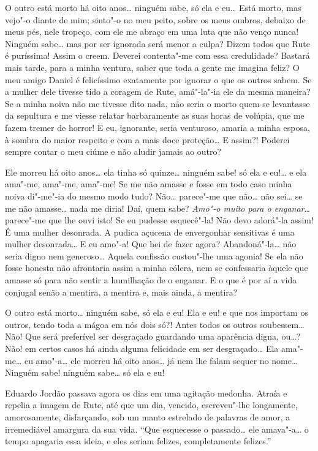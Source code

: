 O outro está morto há oito anos\ldots{} ninguém sabe, só ela e eu\ldots{} Está
morto, mas vejo"-o diante de mim; sinto"-o no meu peito, sobre os meus
ombros, debaixo de meus pés, nele tropeço, com ele me abraço em uma luta
que não venço nunca! Ninguém sabe\ldots{} mas por ser ignorada será menor a
culpa? Dizem todos que Rute é puríssima! Assim o creem. Deverei
contenta"-me com essa credulidade? Bastará mais tarde, para a minha
ventura, saber que toda a gente me imagina feliz? O meu amigo Daniel é
felicíssimo exatamente por ignorar o que os outros sabem. Se a mulher
dele tivesse tido a coragem de Rute, amá"-la"-ia ele da mesma maneira? Se
a minha noiva não me tivesse dito nada, não seria o morto quem se
levantasse da sepultura e me viesse relatar barbaramente as suas horas
de volúpia, que me fazem tremer de horror! E eu, ignorante, seria
venturoso, amaria a minha esposa, à sombra do maior respeito e com a
mais doce proteção\ldots{} E assim?! Poderei sempre contar o meu ciúme e não
aludir jamais ao outro?

Ele morreu há oito anos\ldots{} ela tinha só quinze\ldots{} ninguém sabe! só ela e
eu!\ldots{} e ela ama"-me, ama"-me, ama"-me! Se me não amasse e fosse em todo
caso minha noiva di"-me"-ia do mesmo modo tudo? Não\ldots{} parece"-me que
não\ldots{} não sei\ldots{} se me não amasse\ldots{} nada me diria! Daí, quem sabe?
\emph{Amo"-o muito para o enganar}\ldots{} parece"-me que lhe ouvi isto! Se eu
pudesse esquecê"-la! Não devo adorá"-la assim! É uma mulher desonrada. A
pudica açucena de envergonhar sensitivas é uma mulher desonrada\ldots{} E eu
amo"-a! Que hei de fazer agora? Abandoná"-la\ldots{} não seria digno nem
generoso\ldots{} Aquela confissão custou"-lhe uma agonia! Se ela não fosse
honesta não afrontaria assim a minha cólera, nem se confessaria àquele
que amasse só para não sentir a humilhação de o enganar. E o que é por
aí a vida conjugal senão a mentira, a mentira e, mais ainda, a mentira?

O outro está morto\ldots{} ninguém sabe, só ela e eu! Ela e eu! e que nos
importam os outros, tendo toda a mágoa em nós dois só?! Antes todos os
outros soubessem\ldots{} Não! Que será preferível ser desgraçado guardando
uma aparência digna, ou\ldots{}? Não! em certos casos há ainda alguma
felicidade em ser desgraçado\ldots{} Ela ama"-me\ldots{} eu amo"-a\ldots{} ele morreu há
oito anos\ldots{} já nem lhe falam sequer no nome\ldots{} Ninguém sabe! ninguém
sabe\ldots{} só ela e eu!

Eduardo Jordão passava agora os dias em uma agitação medonha. Atraía e
repelia a imagem de Rute, até que um dia, vencido, escreveu"-lhe
longamente, amorosamente, disfarçando, sob um manto estrelado de
palavras de amor, a irremediável amargura da sua vida. ``Que esquecesse
o passado\ldots{} ele amava"-a\ldots{} o tempo apagaria essa ideia, e eles seriam
felizes, completamente felizes.''

